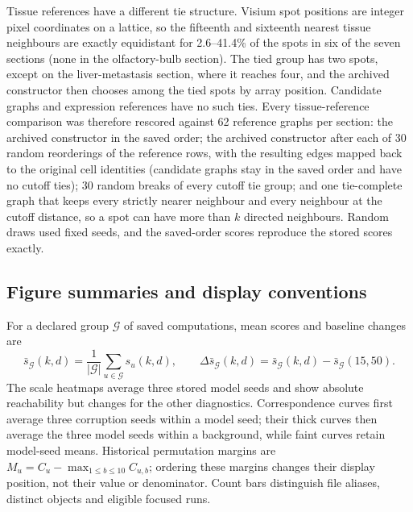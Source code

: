 \documentclass[11pt]{article}
\begin{document}
Tissue references have a different tie structure. Visium spot positions are integer pixel coordinates on a lattice, so the fifteenth and sixteenth nearest tissue neighbours are exactly equidistant for 2.6--41.4\% of the spots in six of the seven sections (none in the olfactory-bulb section). The tied group has two spots, except on the liver-metastasis section, where it reaches four, and the archived constructor then chooses among the tied spots by array position. Candidate graphs and expression references have no such ties. Every tissue-reference comparison was therefore rescored against 62 reference graphs per section: the archived constructor in the saved order; the archived constructor after each of 30 random reorderings of the reference rows, with the resulting edges mapped back to the original cell identities (candidate graphs stay in the saved order and have no cutoff ties); 30 random breaks of every cutoff tie group; and one tie-complete graph that keeps every strictly nearer neighbour and every neighbour at the cutoff distance, so a spot can have more than $k$ directed neighbours. Random draws used fixed seeds, and the saved-order scores reproduce the stored scores exactly.

\subsection{Figure summaries and display conventions}

For a declared group $\mathcal G$ of saved computations, mean scores and baseline changes are
\begin{equation}
 \bar s_{\mathcal G}(k,d)=\frac{1}{|\mathcal G|}\sum_{u\in\mathcal G}s_u(k,d),\qquad
 \Delta\bar s_{\mathcal G}(k,d)=\bar s_{\mathcal G}(k,d)-\bar s_{\mathcal G}(15,50).
\end{equation}
The scale heatmaps average three stored model seeds and show absolute reachability but changes for the other diagnostics. Correspondence curves first average three corruption seeds within a model seed; their thick curves then average the three model seeds within a background, while faint curves retain model-seed means. Historical permutation margins are $M_u=C_u-\max_{1\leq b\leq10}C_{u,b}$; ordering these margins changes their display position, not their value or denominator. Count bars distinguish file aliases, distinct objects and eligible focused runs.
\end{document}
